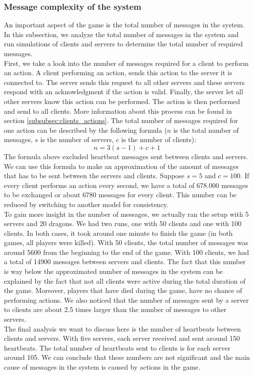 	\subsubsection{Message complexity of the system}
	\label{subsubsec:nummessages}
		An important aspect of the game is the total number of messages in the system. In this subsection, we analyze the total number of messages in the system and run simulations of clients and servers to determine the total number of required messages.\\
		First, we take a look into the number of messages required for a client to perform an action. A client performing an action, sends this action to the server it is connected to. The server sends this request to all other servers and these servers respond with an acknowledgment if the action is valid. Finally, the server let all other servers know this action can be performed. The action is then performed and send to all clients. More information about this process can be found in section \ref{subsubsec:clients_actions}. The total number of messages required for one action can be described by the following formula ($ n $ is the total number of messages, $ s $ is the number of servers, $ c $ is the number of clients):
		$$ n = 3(s - 1) + c + 1 $$
		The formula above excluded heartbeat messages sent between clients and servers. We can use this formula to make an approximation of the amount of messages that has to be sent between the servers and clients. Suppose $ s = 5 $ and $ c = 100 $. If every client performs an action every second, we have a total of 678.000 messages to be exchanged or about 6780 messages for every client. This number can be reduced by switching to another model for consistency.\\
		To gain more insight in the number of messages, we actually ran the setup with 5 servers and 20 dragons. We had two runs, one with 50 clients and one with 100 clients. In both cases, it took around one minute to finish the game (in both games, all players were killed). With 50 clients, the total number of messages was around 5600 from the beginning to the end of the game. With 100 clients, we had a total of 14900 messages between servers and clients. The fact that this number is way below the approximated number of messages in the system can be explained by the fact that not all clients were active during the total duration of the game. Moreover, players that have died during the game, have no chance of performing actions. We also noticed that the number of messages sent by a server to clients are about 2.5 times larger than the number of messages to other servers.\\
		The final analysis we want to discuss here is the number of heartbeats between clients and servers. With five servers, each server received and sent around 150 heartbeats. The total number of heartbeats sent to clients is for each server around 105. We can conclude that these numbers are not significant and the main cause of messages in the system is caused by actions in the game.
